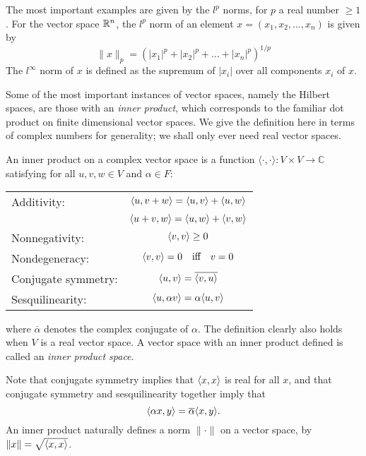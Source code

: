 \documentclass[12pt]{report}
\begin{document}
\begin{example}[$l^p$ Norms]
The most important examples are given by the $l^p$ norms, for $p$ a real number $\ge 1$. For the vector space $\mathbb{R}^n$, the $l^p$ norm of an element $x = (x_1,x_2,\ldots,x_n)$ is given by
$$\|x\|_p = \left(|x_1|^p + |x_2|^p + \ldots + |x_n|^p\right)^{1/p}$$
The $l^\infty$ norm of $x$ is defined as the supremum of $|x_i|$ over all components $x_i$ of $x$.
\end{example}

Some of the most important instances of vector spaces, namely the Hilbert spaces, are those with an \emph{inner product}, which corresponds to the familiar dot product on finite dimensional vector spaces. We give the definition here in terms of complex numbers for generality; we shall only ever need real vector spaces.
\begin{defn}
An inner product on a complex vector space is a function $\langle \cdot ,\cdot \rangle : V \times V \rightarrow \mathbb{C}$ satisfying for all $u,v,w \in V$ and $\alpha \in F$:
\begin{center}
\begin{tabular}{lc}
Additivity: &
$\langle u, v+w \rangle  =  \langle u, v \rangle + \langle u, w \rangle$\\
\vspace{0.1cm}
&$\langle u+v, w \rangle  =  \langle u, w \rangle + \langle v, w \rangle$\\
\vspace{0.1cm}
Nonnegativity: &
$\langle v, v \rangle \ge 0$\\
\vspace{0.1cm}
Nondegeneracy: &
$\langle v, v \rangle = 0\quad \textrm{iff}\quad  v = 0$\\
\vspace{0.1cm}
Conjugate symmetry: &
$\langle u, v \rangle = \overline{\langle v, u \rangle}$\\
\vspace{0.1cm}
Sesquilinearity: &
$ \langle u, \alpha v \rangle = \alpha\langle u, v \rangle$
\end{tabular}
\end{center}
where $\overline{\alpha}$ denotes the complex conjugate of $\alpha$. The definition clearly also holds when $V$ is a real vector space. A vector space with an inner product defined is called an \emph{inner product space}.

Note that conjugate symmetry implies that $\langle x, x \rangle$ is real for all $x$, and that conjugate symmetry and sesquilinearity together imply that
$$\langle \alpha x, y \rangle = \overline{\alpha}\langle x, y \rangle.$$
An inner product naturally defines a norm $\|\cdot\|$ on a vector space, by $\|x\| = \sqrt{\langle x, x \rangle}$.
\end{defn}
\end{document}
